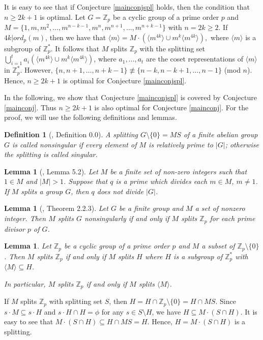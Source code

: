 \documentclass[preprint]{elsarticle}
\newtheorem{lem}[thm]{Lemma}
\newtheorem{defn}[thm]{Definition}
\begin{document}
\rmk It is easy to see that if Conjecture \ref{mainconjspl} holds,
then the condition that $n\geq 2k+1$ is optimal.
Let $G=\mathbb{Z}_p$ be a cyclic group of a prime order $p$ and $M=\{1,m,m^2,\ldots ,m^{n-k-1},m^{n},m^{n+1},\ldots ,m^{n+k-1}\}$ with $n=2k\geq 2$.
If $4k|ord_p(m)$,
then we have that
$\langle m\rangle=M\cdot (\langle m^{4k}\rangle\cup m^k\langle m^{4k}\rangle),$
where $\langle m\rangle$ is a subgroup of $\mathbb{Z}_p^*$.
It follows that $M$ splits $\mathbb{Z}_p$ with
the splitting set $\bigcup_{i=1}^ta_i(\langle m^{4k}\rangle\cup m^k\langle m^{4k}\rangle)$,
where $a_1,\ldots ,a_t$ are the coset representations of $\langle m\rangle$ in $\mathbb{Z}_p^*$.
However, $\{n,n+1,\ldots ,n+k-1\}\not\equiv \{n-k,n-k+1,\ldots ,n-1\}$ (mod $n$).
Hence, $n\geq 2k+1$ is optimal for Conjecture \ref{mainconjspl}.

In the following, we show that Conjecture \ref{mainconjspl} is covered by Conjecture \ref{mainconj}.
Thus $n\geq 2k+1$ is also optimal for Conjecture \ref{mainconj}.
For the proof, we will use the following definitions and lemmas.

\begin{defn}[\cite{[H]}, Definition 0.0]\label{def2}
A splitting $G\setminus \{0\}= MS$ of a finite abelian group $G$ is called \textit{nonsingular}
if every element of $M$ is relatively prime to $|G|$; otherwise the splitting is called \textit{singular}.
\end{defn}

\begin{lem}[\cite{[GS]}, Lemma 5.2]\label{relativelyprime}
Let $M$ be a finite set of non-zero integers such that $1\in M$ and $|M|>1$.
Suppose that $q$ is a prime which divides each $m\in M$, $m\neq 1$.
If $M$ splits a group $G$,
then $q$ does not divide $|G|$.
\end{lem}

\begin{lem}[\cite{[H]}, Theorem 2.2.3] \label{nonsingular-sp}
Let $G$ be a finite group and $M$ a set of nonzero integer. Then
$M$ splits $G$ nonsingularly if and only if $M$ splits $\mathbb{Z}_p$ for each prime divisor $p$ of $G$.
\end{lem}

\begin{lem}\label{p-cyclic-group}
Let $\mathbb{Z}_p$ be a cyclic group of a prime order $p$ and $M$ a subset of $\mathbb{Z}_p\setminus \{0\}$.
Then $M$ splits $\mathbb{Z}_p$ if and only if $M$ splits $H$ where $H$ is a subgroup of $\mathbb{Z}_p^*$ with $\langle M\rangle\subseteq H$.

In particular, $M$ splits $\mathbb{Z}_p$ if and only if $M$ splits $\langle M\rangle$.
\end{lem}
\pf
If $M$ splits $\mathbb{Z}_p$ with splitting set $S$, then $H=H\cap \mathbb{Z}_p\setminus \{0\}=H\cap MS$.
Since $s\cdot M\subseteq s\cdot H$ and $s\cdot H\cap H=\phi$ for any $s\in S\setminus H$,
we have $H\subseteq M\cdot (S\cap H)$.
It is easy to see that $M\cdot (S\cap H)\subseteq H\cap MS=H$.
Hence, $H=M\cdot (S\cap H)$ is a splitting.
\end{document}
